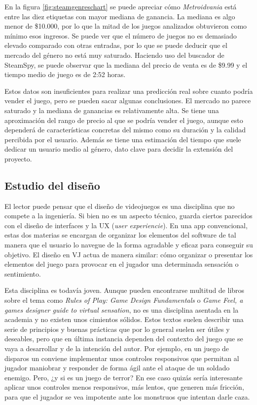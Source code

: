 En la figura \ref{fig:steamgenreschart} se puede apreciar cómo \textit{Metroidvania} está entre las diez etiquetas con mayor mediana de ganancia. La mediana es algo menor de \$10.000, por lo que la mitad de los juegos analizados obtuvieron como mínimo esos ingresos. Se puede ver que el número de juegos no es demasiado elevado comparado con otras entradas, por lo que se puede deducir que el mercado del género no está muy saturado. Haciendo uso del buscador de SteamSpy, se puede observar que la mediana del precio de venta es de \$9.99 y el tiempo medio de juego es de 2:52 horas.

Estos datos son insuficientes para realizar una predicción real sobre cuanto podría vender el juego, pero se pueden sacar algunas conclusiones. El mercado no parece saturado y la mediana de ganancias es relativamente alta. Se tiene una aproximación del rango de precio al que se podría vender el juego, aunque esto dependerá de características concretas del mismo como su duración y la calidad percibida por el usuario. Además se tiene una estimación del tiempo que suele dedicar un usuario medio al género, dato clave para decidir la extensión del proyecto.

\subsection{Estudio del diseño}

El lector puede pensar que el diseño de videojuegos es una disciplina que no compete a la ingeniería. Si bien no es un aspecto técnico, guarda ciertos parecidos con el diseño de interfaces y la UX (\textit{user experiencie}). En una app convencional, estas dos materias se encargan de organizar los elementos del software de tal manera que el usuario lo navegue de la forma agradable y eficaz para conseguir su objetivo. El diseño en VJ actua de manera similar: cómo organizar o presentar los elementos del juego para provocar en el jugador una determinada sensación o sentimiento.

Esta disciplina es todavía joven. Aunque pueden encontrarse multitud de libros sobre el tema como \textit{Rules of Play: Game Design Fundamentals}\cite{rules-of-play} o \textit{Game Feel, a games designer guide to virtual sensation}\cite{gamefeel}, no es una disciplina asentada en la academia y no existen unos cimientos sólidos. Estos textos suelen describir una serie de principios y buenas prácticas que por lo general suelen ser útiles y deseables, pero que en última instancia dependen del contexto del juego que se vaya a desarrollar y de la intención del autor. Por ejemplo, en un juego de disparos un conviene implementar unos controles responsivos que permitan al jugador maniobrar y responder de forma ágil ante el ataque de un soldado enemigo. Pero, ¿y si es un juego de terror? En ese caso quizás sería interesante aplicar unos controles menos responsivos, más lentos, que generen más fricción, para que el jugador se vea impotente ante los monstruos que intentan darle caza.

